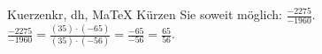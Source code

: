 \begin{MAufgabe}{Kuerzen}{kr, dh, MaTeX}
K\"urzen Sie soweit m\"oglich: $\frac{-2275}{-1960}$.\\ 
\ifLsg\MLoesung
\quad $\frac{-2275}{-1960}=\frac{(35)\cdot(-65)}{(35)\cdot(-56)}=\frac{-65}{-56}=\frac{65}{56}$.\else\relax\fi
 \end{MAufgabe}
